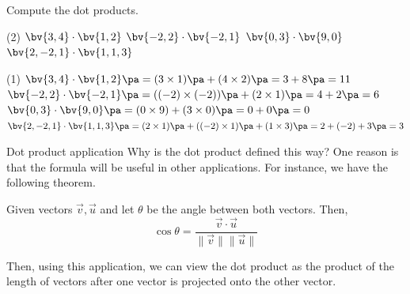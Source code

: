 \begin{frame}[t]
\begin{ex}{}
Compute the dot products.
\begin{tasks}(2)
\task $\bv{3,4} \cdot \bv{1,2}$
\task $\bv{-2,2} \cdot \bv{-2,1}$
\task $\bv{0,3} \cdot \bv{9,0}$
\task $\bv{2,-2,1} \cdot \bv{1,1,3}$
\end{tasks}
\end{ex}
\begin{sol}
\begin{tasks}(1)
\task $\bv{3,4} \cdot \bv{1,2} \pa = (3 \times 1) \pa + (4 \times 2) \pa = 3 + 8 \pa = 11$ \pa
\task $\bv{-2,2} \cdot \bv{-2,1} \pa = ((-2) \times (-2)) \pa + (2 \times 1) \pa = 4 + 2 \pa = 6$ \pa
\task  $\bv{0,3} \cdot \bv{9,0} \pa = (0 \times 9) + (3 \times 0) \pa = 0 + 0 \pa = 0$ \pa
\task $\bv{2,-2,1} \cdot \bv{1,1,3} \pa = (2 \times 1) \pa + ((-2) \times 1) \pa + (1 \times 3) \pa = 2 + (-2) + 3 \pa = 3$
\end{tasks}
\end{sol}
\end{frame}

\begin{frame}{Dot product application}
Why is the dot product defined this way? One reason is that the formula will be useful in other applications. For instance, we have the following theorem.

\begin{thm}{}{}
Given vectors $\vec{v}, \vec{u}$ and let $\theta$ be the angle between both vectors. Then,
\[ \cos \theta = \frac{\vec{v} \cdot \vec{u}}{\| \vec{v} \| \| \vec{u} \|}\]
\end{thm}

Then, using this application, we can view the dot product as the product of the length of vectors after one vector is projected onto the other vector.
\end{frame}

